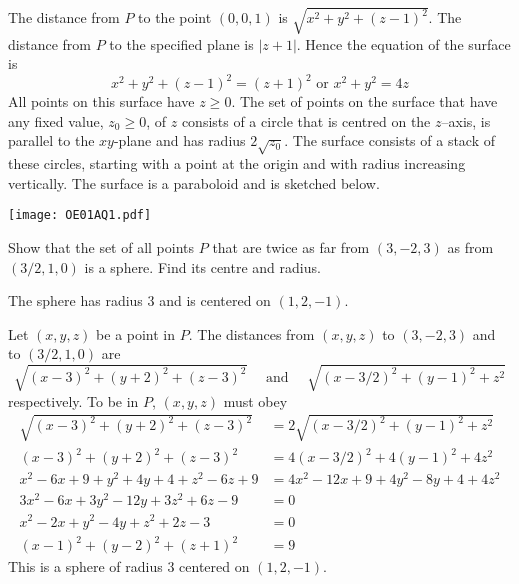 \begin{solution}
The distance from $P$ to the point $(0,0,1)$ is $\sqrt{x^2+y^2+(z-1)^2}$.
The distance from $P$ to the specified plane is $|z+1|$. Hence the equation
of the surface is
\begin{equation*}
x^2+y^2+(z-1)^2=(z+1)^2\text{ or }
   x^2+y^2=4z
\end{equation*}
All points on this surface have $z\ge 0$. The set of points on the surface
that have any fixed value, $z_0\ge 0$, of $z$ consists of a circle that is
centred on the $z$--axis, is parallel to the $xy$-plane and has radius
$2\sqrt{z_0}$. The surface consists of a stack of these circles, starting
with a point at the origin and with radius increasing vertically. The surface
is a paraboloid and is sketched below.
\begin{center}
     \texttt{[image: OE01AQ1.pdf]}
\end{center}
\end{solution}

\begin{question}
Show that the set of all points $P$ that are twice as far from
$(3,-2,3)$ as from $(3/2,1,0)$ is a sphere. Find its centre and radius.
\end{question}


\begin{answer}
The sphere has radius 3 and is centered on $(1,2,-1)$.
\end{answer}

\begin{solution}
Let $(x,y,z)$ be a point in $P$. The distances from
$(x,y,z)$ to $(3,-2,3)$ and to $(3/2,1,0)$ are 
\begin{equation*}
\sqrt{(x-3)^2+(y+2)^2+(z-3)^2}\quad\text{ and }\quad
\sqrt{(x-3/2)^2+(y-1)^2+z^2}
\end{equation*}
respectively. To be in $P$, $(x,y,z)$ must obey
\begin{align*}
\sqrt{(x-3)^2+(y+2)^2+(z-3)^2}&=2\sqrt{(x-3/2)^2+(y-1)^2+z^2} \\
(x-3)^2+(y+2)^2+(z-3)^2&=4(x-3/2)^2+4(y-1)^2+4z^2 \\
x^2-6x+9+y^2+4y+4+z^2-6z+9&=4x^2-12x+9+4y^2-8y+4+4z^2 \\
3x^2-6 x+3y^2-12y+3z^2+6z-9&=0 \\
x^2-2 x+y^2-4y+z^2+2z-3&=0 \\
(x-1)^2+(y-2)^2+(z+1)^2&=9
\end{align*}
This is a sphere of radius 3 centered on $(1,2,-1)$.
\end{solution}



